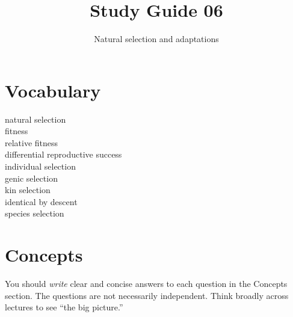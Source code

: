 \documentclass[letterpaper]{tufte-handout}
\title{Study Guide 06\hfill}
\author{Natural selection and adaptations}
\date{} %
\begin{document}
\maketitle	%


\section{Vocabulary} 
\vspace{-1\baselineskip}
\begin{multicols}{2}
natural selection\\
fitness\\
relative fitness\\
differential reproductive success\\
individual selection \\
genic selection \\
kin selection \\
identical by descent \\
species selection \\
\end{multicols}

\section{Concepts}

You should \emph{write} clear and concise answers to each question in the Concepts section.  The questions are not necessarily independent.  Think broadly across lectures to see “the big picture.”
\end{document}
